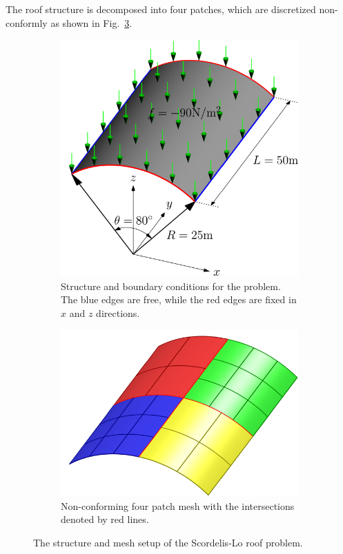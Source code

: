 \documentclass[preprint,12pt]{elsarticle}
\theoremstyle{remark}
\begin{document}
The roof structure is decomposed into four patches, which are discretized non-conformly as shown in Fig.~\ref{fig:scordelis-lo-decompose}.
\begin{figure}[hbt]
    \centering
    \captionsetup[subfigure]{font = footnotesize}
    \begin{subfigure}[b]{.48\textwidth}
        \centering
        \includegraphics[width = \textwidth]{roof_config}
        \caption{Structure and boundary conditions for the problem. The blue edges are free, while the red edges are fixed in $x$ and $z$ directions.}\label{fig:scordelis-lo}
    \end{subfigure}
    \begin{subfigure}[b]{.48\textwidth}
        \centering
        \includegraphics[width = \textwidth]{roof_decompose}
        \vspace{.5cm}
        \caption{Non-conforming four patch mesh with the intersections denoted by red lines.}\label{fig:scordelis-lo-decompose}
    \end{subfigure}
	\caption{The structure and mesh setup of the Scordelis-Lo roof problem.}
\end{figure}

\clearpage


\end{document}
